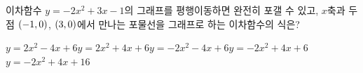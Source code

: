 \hspace*{2mm}\begin{minipage}[t]{\dimexpr\linewidth-2mm\relax}\vspace{0pt}
이차함수 $y=-2x^2+3x-1$의 그래프를 평행이동하면 완전히 포갤 수 있고, $x$축과 두 점 $(-1{,}\mkern3mu 0)$, $(3{,}\mkern3mu 0)$에서 만나는 포물선을 그래프로 하는 이차함수의 식은?
\begin{choicesii}{$y=2x^2-4x+6$}{$y=2x^2+4x+6$}{$y=-2x^2-4x+6$}{$y=-2x^2+4x+6$}{$y=-2x^2+4x+16$}\end{choicesii}\end{minipage}
